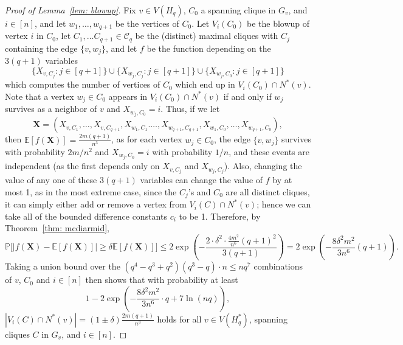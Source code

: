 \documentclass[A4paper,reqno,oneside,12pt]{amsart}
\theoremstyle{plain}
\theoremstyle{definition}
\newcommand{\scC}{\mathscr{C}}
\newcommand{\bbE}{\mathbb{E}}
\newcommand{\bbP}{\mathbb{P}}
\def\d{\delta}
\begin{document}
\begin{proof}[Proof of Lemma~\ref{lem: blowup}]
    Fix $v \in V(H_q)$, $C_0$ a spanning clique in $G_v$, and $i \in [n]$, and let $w_1, \dots, w_{q+1}$ be the vertices of $C_0$.
    Let $V_i(C_0)$ be the blowup of vertex $i$ in $C_0$, let $C_1, \dots C_{q+1} \in \scC_q$ be the (distinct) maximal cliques with $C_j$ containing the edge $\{v,w_j\}$, and let $f$ be the function depending on the $3(q+1)$ variables
    \begin{equation*}
        \{X_{v,C_j}: j \in [q+1]\} \cup \{X_{w_j,C_j}: j \in [q+1]\} \cup \{X_{w_j, C_0}: j \in [q+1]\}
    \end{equation*}
    which computes the number of vertices of $C_0$ which end up in $V_i(C_0) \cap N^*(v)$.
    Note that a vertex $w_j \in C_0$ appears in $V_i(C_0) \cap N^*(v)$ if and only if $w_j$ survives as a neighbor of $v$ and $X_{w_j,C_0} = i$.
    Thus, if we let
    \begin{equation*}
        \mathbf{X} = (X_{v,C_1}, \dots, X_{v,C_{q+1}}, X_{w_1,C_1}. \dots, X_{w_{q+1},C_{q+1}}, X_{w_1, C_0}, \dots, X_{w_{q+1},C_0}),
    \end{equation*}
    then $\bbE[f(\mathbf{X})] = \frac{2m(q+1)}{n^3}$, as for each vertex $w_j \in C_0$, the edge $\{v,w_j\}$ survives with probability $2m/n^2$ and $X_{w_j,C_0} = i$ with probability $1/n$, and these events are independent (as the first depends only on $X_{v, C_j}$ and $X_{w_j,C_j}$).
    Also, changing the value of any one of these $3(q+1)$ variables can change the value of $f$ by at most 1, as in the most extreme case,
    since the $C_j$'s and $C_0$ are all distinct cliques,
    it can simply either add or remove a vertex from $V_i(C) \cap N^*(v)$; hence we can take all of the bounded difference constants $c_i$ to be 1.
    Therefore, by Theorem~\ref{thm: mcdiarmid},
    \begin{equation*}
        \bbP {\Big [} {\big |} f(\mathbf{X}) - \bbE[f(\mathbf{X})] {\big |} \geq \d \bbE[f(\mathbf{X})] {\Big ]} 
        \leq 2\exp \left( - \frac{2 \cdot \d^2 \cdot \frac{4m^2}{n^6} (q+1)^2}{3(q+1)} \right) 
        = 2 \exp \left( - \frac{8 \d^2 m^2}{3n^6} (q+1) \right).
    \end{equation*}
    Taking a union bound over the $(q^4-q^3+q^2)(q^3-q) \cdot n \leq nq^7$ combinations of $v$, $C_0$ and $i \in [n]$ then shows that with probability at least
    \begin{equation}
    \label{eqn: probability}
        1 - 2 \exp \left( - \frac{8 \d^2 m^2}{3n^6} \cdot q + 7\ln(nq) \right),
    \end{equation}
    $|V_i(C) \cap N^*(v)| = (1\pm\d)\frac{2m(q+1)}{n^3}$ holds for all $v \in V(H_q^*)$, spanning cliques $C$ in $G_v$, and $i \in [n]$.
\end{proof}
\end{document}
